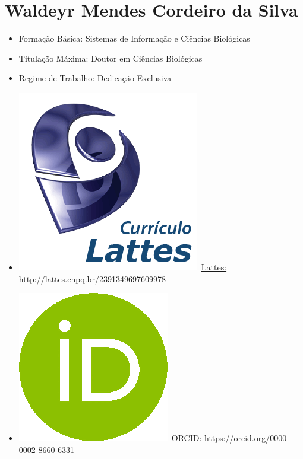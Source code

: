 \documentclass[11pt,fleqn]{book} %
\begin{document}
\section{Waldeyr Mendes Cordeiro da Silva}\label{WaldeyrMendes}
\begin{itemize}
	\item Formação Básica: Sistemas de Informação e Ciências Biológicas
	\item Titulação Máxima: Doutor em Ciências Biológicas
	\item Regime de Trabalho: Dedicação Exclusiva
	\item \includegraphics[scale=.03]{Pictures/lattes}~\href{http://lattes.cnpq.br/2391349697609978}{Lattes: http://lattes.cnpq.br/2391349697609978}
	\item \includegraphics[scale=.15]{Pictures/orcid}~\href{https://orcid.org/0000-0002-8660-6331}{ORCID: https://orcid.org/0000-0002-8660-6331}
\end{itemize}
\end{document}
